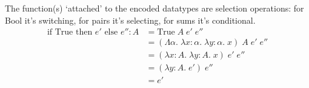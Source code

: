 \documentclass[a4paper,11pt]{article}
\begin{document}
{{        The function(s) `attached' to the encoded datatypes are selection operations: for Bool it's switching, for pairs
        it's selecting, for sums it's conditional.
        \begin{align*}
        \text{if True then }e'\text{ else } e'' : A &= \text{True}\;A\;e'\;e'' \\
                                    &= (\Lambda\alpha.\;\lambda x:\alpha.\;\lambda y:\alpha.\;x)\;A\;e'\;e'' \\
                                    &= (\lambda x:A.\;\lambda y:A.\;x)\;e'\;e'' \\
                                    &= (\lambda y:A.\;e')\;e'' \\
                                    &= e' \\
        \end{align*}
    }
}
\end{document}
